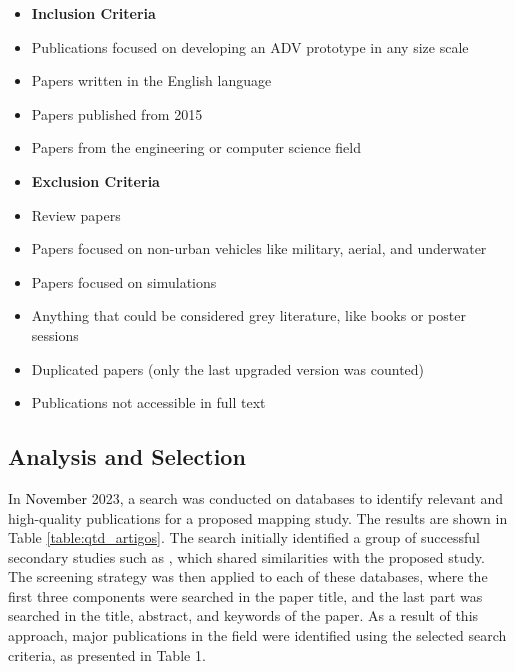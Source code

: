 \documentclass[lettersize,journal]{IEEEtran}
\begin{document}
\begin{itemize}
    \item[]\textbf{Inclusion Criteria} 
    \item[-] Publications focused on developing an ADV prototype in any size scale
    \item[-] Papers written in the English language
    \item[-] Papers published from 2015
    \item[-] Papers from the engineering or computer science field\\
\end{itemize}

\begin{itemize}
    \item[]\textbf{Exclusion Criteria} 
    \item[-] Review papers
    \item[-] Papers focused on non-urban vehicles like military, aerial, and underwater
    \item[-] Papers focused on simulations
    \item[-] Anything that could be considered grey literature, like books or poster sessions
    \item[-] Duplicated papers (only the last upgraded version was counted)
    \item[-] Publications not accessible in full text
\end{itemize}

\subsection{Analysis and Selection}

In \textcolor{black} {November} 2023, a search was conducted on databases to identify relevant and high-quality publications for a proposed mapping study. The results are shown in Table \ref{table:qtd_artigos}. The search initially identified a group of successful secondary studies such as \cite{Belmonte2019,Barros-Justo2018,Tiwari2018,Heradio2018,LaraSoares2019a}, which shared similarities with the proposed study. The screening strategy was then applied to each of these databases, where the first three components were searched in the paper title, and the last part was searched in the title, abstract, and keywords of the paper. As a result of this approach, major publications in the field were identified using the selected search criteria, as presented in Table 1. 
\end{document}
